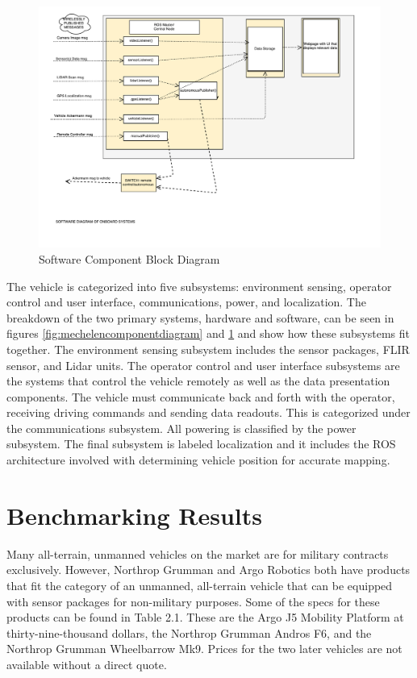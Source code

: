 \begin{figure}[H]
\centering
\includegraphics[scale=0.45]{Software_Component_Diagram}
\caption{Software Component Block Diagram}
\label{fig:softwarecomponentdiagram}
\end{figure}


The vehicle is categorized into five subsystems: environment sensing, operator control and user interface, communications, power, and localization. The breakdown of the two primary systems, hardware and software, can be seen in figures \ref{fig:mechelencomponentdiagram} and \ref{fig:softwarecomponentdiagram} and show how these subsystems fit together. The environment sensing subsystem includes the sensor packages, FLIR sensor, and Lidar units. The operator control and user interface subsystems are the systems that control the vehicle remotely as well as the data presentation components. The vehicle must communicate back and forth with the operator, receiving driving commands and sending data readouts. This is categorized under the communications subsystem. All powering is classified by the power subsystem. The final subsystem is labeled localization and it includes the ROS architecture involved with determining vehicle position for accurate mapping. \\
%
\section{Benchmarking Results}
Many all-terrain, unmanned vehicles on the market are for military contracts exclusively. However, Northrop Grumman and Argo Robotics both have products that fit the category of an unmanned, all-terrain vehicle that can be equipped with sensor packages for non-military purposes. Some of the specs for these products can be found in Table 2.1. These are the Argo J5 Mobility Platform at thirty-nine-thousand dollars, the Northrop Grumman Andros F6, and the Northrop Grumman Wheelbarrow Mk9. Prices for the two later vehicles are not available without a direct quote. 

